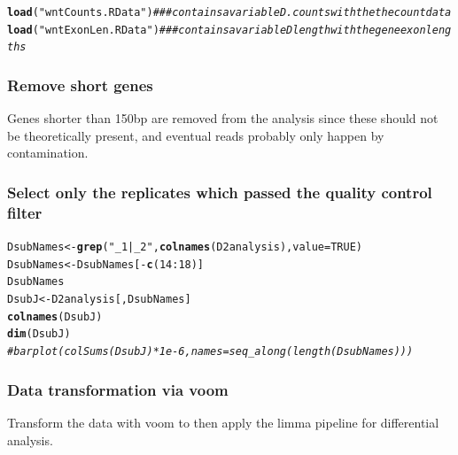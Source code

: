 \documentclass[a4paper]{article}\usepackage[]{graphicx}\usepackage[]{color}
\makeatletter
\newcommand{\hlnum}[1]{\textcolor[rgb]{0.686,0.059,0.569}{#1}}%
\newcommand{\hlstr}[1]{\textcolor[rgb]{0.192,0.494,0.8}{#1}}%
\newcommand{\hlcom}[1]{\textcolor[rgb]{0.678,0.584,0.686}{\textit{#1}}}%
\newcommand{\hlopt}[1]{\textcolor[rgb]{0,0,0}{#1}}%
\newcommand{\hlstd}[1]{\textcolor[rgb]{0.345,0.345,0.345}{#1}}%
\newcommand{\hlkwb}[1]{\textcolor[rgb]{0.69,0.353,0.396}{#1}}%
\newcommand{\hlkwc}[1]{\textcolor[rgb]{0.333,0.667,0.333}{#1}}%
\newcommand{\hlkwd}[1]{\textcolor[rgb]{0.737,0.353,0.396}{\textbf{#1}}}%
\newenvironment{kframe}{%
 \def\at@end@of@kframe{}%
 \ifinner\ifhmode%
  \def\at@end@of@kframe{\end{minipage}}%
  \begin{minipage}{\columnwidth}%
 \fi\fi%
 \def\FrameCommand##1{\hskip\@totalleftmargin \hskip-\fboxsep
 \colorbox{shadecolor}{##1}\hskip-\fboxsep
     \hskip-\linewidth \hskip-\@totalleftmargin \hskip\columnwidth}%
 \MakeFramed {\advance\hsize-\width
   \@totalleftmargin\z@ \linewidth\hsize
   \@setminipage}}%
 {\par\unskip\endMakeFramed%
 \at@end@of@kframe}
\newenvironment{knitrout}{}{} %
\makeatother
\begin{document}
\begin{knitrout}
\color{fgcolor}\begin{kframe}
\begin{alltt}
\hlkwd{load}\hlstd{(}\hlstr{"wntCounts.RData"}\hlstd{)}  \hlcom{### contains a variable D.counts with the the count data}
\hlkwd{load}\hlstd{(}\hlstr{"wntExonLen.RData"}\hlstd{)}  \hlcom{### contains a variable Dlength with the gene exon lengths}
\end{alltt}
\end{kframe}
\end{knitrout}

\subsubsection*{Remove short genes}
Genes shorter than 150bp are removed from the analysis since these should not be theoretically present, and eventual reads probably only happen by contamination.



\subsubsection*{Select only the replicates which passed the quality control filter}

\begin{knitrout}
\color{fgcolor}\begin{kframe}
\begin{alltt}
\hlstd{DsubNames} \hlkwb{<-} \hlkwd{grep}\hlstd{(}\hlstr{"_1|_2"}\hlstd{,} \hlkwd{colnames}\hlstd{(D2analysis),} \hlkwc{value} \hlstd{=} \hlnum{TRUE}\hlstd{)}
\hlstd{DsubNames} \hlkwb{<-} \hlstd{DsubNames[}\hlopt{-}\hlkwd{c}\hlstd{(}\hlnum{14}\hlopt{:}\hlnum{18}\hlstd{)]}
\hlstd{DsubNames}
\hlstd{DsubJ} \hlkwb{<-} \hlstd{D2analysis[, DsubNames]}
\hlkwd{colnames}\hlstd{(DsubJ)}
\hlkwd{dim}\hlstd{(DsubJ)}
\hlcom{# barplot(colSums(DsubJ)*1e-6, names=seq_along(length(DsubNames)))}
\end{alltt}
\end{kframe}
\end{knitrout}

\subsubsection*{Data transformation via voom}
Transform the data with voom to then apply the limma pipeline for differential analysis.
\end{document}
